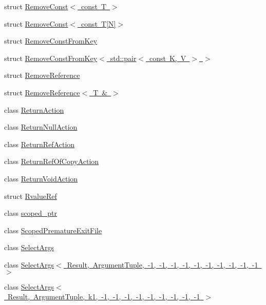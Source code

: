 \begin{DoxyCompactItemize}
struct \mbox{\hyperlink{structtesting_1_1internal_1_1RemoveConst_3_01const_01T_01_4}{Remove\+Const$<$ const T $>$}}
\item 
struct \mbox{\hyperlink{structtesting_1_1internal_1_1RemoveConst_3_01const_01T[N]_4}{Remove\+Const$<$ const T\mbox{[}\+N\mbox{]}$>$}}
\item 
struct \mbox{\hyperlink{structtesting_1_1internal_1_1RemoveConstFromKey}{Remove\+Const\+From\+Key}}
\item 
struct \mbox{\hyperlink{structtesting_1_1internal_1_1RemoveConstFromKey_3_01std_1_1pair_3_01const_01K_00_01V_01_4_01_4}{Remove\+Const\+From\+Key$<$ std\+::pair$<$ const K, V $>$ $>$}}
\item 
struct \mbox{\hyperlink{structtesting_1_1internal_1_1RemoveReference}{Remove\+Reference}}
\item 
struct \mbox{\hyperlink{structtesting_1_1internal_1_1RemoveReference_3_01T_01_6_01_4}{Remove\+Reference$<$ T \& $>$}}
\item 
class \mbox{\hyperlink{classtesting_1_1internal_1_1ReturnAction}{Return\+Action}}
\item 
class \mbox{\hyperlink{classtesting_1_1internal_1_1ReturnNullAction}{Return\+Null\+Action}}
\item 
class \mbox{\hyperlink{classtesting_1_1internal_1_1ReturnRefAction}{Return\+Ref\+Action}}
\item 
class \mbox{\hyperlink{classtesting_1_1internal_1_1ReturnRefOfCopyAction}{Return\+Ref\+Of\+Copy\+Action}}
\item 
class \mbox{\hyperlink{classtesting_1_1internal_1_1ReturnVoidAction}{Return\+Void\+Action}}
\item 
struct \mbox{\hyperlink{structtesting_1_1internal_1_1RvalueRef}{Rvalue\+Ref}}
\item 
class \mbox{\hyperlink{classtesting_1_1internal_1_1scoped__ptr}{scoped\+\_\+ptr}}
\item 
class \mbox{\hyperlink{classtesting_1_1internal_1_1ScopedPrematureExitFile}{Scoped\+Premature\+Exit\+File}}
\item 
class \mbox{\hyperlink{classtesting_1_1internal_1_1SelectArgs}{Select\+Args}}
\item 
class \mbox{\hyperlink{classtesting_1_1internal_1_1SelectArgs_3_01Result_00_01ArgumentTuple_00_01-1_00_01-1_00_01-1_00_d26521468f85209f6b4c61eca65baf5d}{Select\+Args$<$ Result, Argument\+Tuple, -\/1, -\/1, -\/1, -\/1, -\/1, -\/1, -\/1, -\/1, -\/1, -\/1 $>$}}
\item 
class \mbox{\hyperlink{classtesting_1_1internal_1_1SelectArgs_3_01Result_00_01ArgumentTuple_00_01k1_00_01-1_00_01-1_00_6a5fc7802a60cf36c89bd10623cc9552}{Select\+Args$<$ Result, Argument\+Tuple, k1, -\/1, -\/1, -\/1, -\/1, -\/1, -\/1, -\/1, -\/1, -\/1 $>$}}

\end{DoxyCompactItemize}
